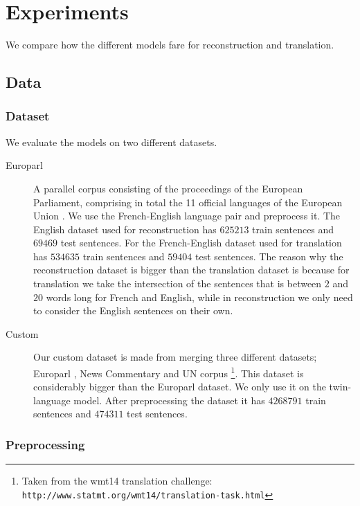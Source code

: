 \chapter{Experiments}
\label{ExperimentsCh}

We compare how the different models fare for reconstruction and translation. 

\section{Data}

\subsection{Dataset}

We evaluate the models on two different datasets.

\begin{description}
\item[Europarl] A parallel corpus consisting of the proceedings of the European
  Parliament,
  comprising in total the 11 official languages of the European Union
  \cite{koehn2005epc}. We use the French-English language pair and preprocess
  it. The English dataset used for reconstruction has $625213$ train sentences
  and $69469$ test sentences. For the French-English dataset used for
  translation has $534635$ train sentences and $59404$ test sentences. The
  reason why the reconstruction dataset is bigger than the translation dataset
  is because for translation we take the intersection of the sentences that is
  between $2$ and $20$ words long for French and English, while in
  reconstruction we only need to consider the English sentences on their own.
\item[Custom] Our custom dataset is made from merging three different datasets;
  Europarl \cite{koehn2005epc}, News Commentary and UN corpus
  \cite{ZIEMSKI16.1195} \footnote{Taken from the wmt14 translation challenge: \texttt{http://www.statmt.org/wmt14/translation-task.html}}. This dataset is
  considerably bigger than the Europarl dataset. We only use it on the 
  twin-language model. After preprocessing the dataset it has $4268791$ train
  sentences and $474311$ test sentences.
\end{description}

\subsection{Preprocessing}

